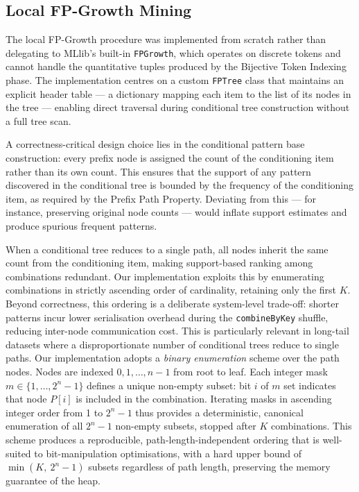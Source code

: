 \documentclass[10pt, twocolumn]{article}
\begin{document}
\subsection{Local FP-Growth Mining}

The local FP-Growth procedure was implemented from scratch rather than
delegating to MLlib's built-in \texttt{FPGrowth}, which operates on discrete
tokens and cannot handle the quantitative tuples produced by the Bijective
Token Indexing phase. The implementation centres on a custom \texttt{FPTree}
class that maintains an explicit header table — a dictionary mapping each item
to the list of its nodes in the tree — enabling direct traversal during
conditional tree construction without a full tree scan.

A correctness-critical design choice lies in the conditional pattern base
construction: every prefix node is assigned the count of the conditioning item
rather than its own count. This ensures that the support of any pattern
discovered in the conditional tree is bounded by the frequency of the
conditioning item, as required by the Prefix Path Property. Deviating from
this — for instance, preserving original node counts — would inflate support
estimates and produce spurious frequent patterns.

When a conditional tree reduces to a single path, all nodes inherit the same
count from the conditioning item, making support-based ranking among
combinations redundant. Our implementation exploits this by enumerating
combinations in strictly ascending order of cardinality, retaining only the
first $K$. Beyond correctness, this ordering is a deliberate system-level
trade-off: shorter patterns incur lower serialisation overhead during the
\texttt{combineByKey} shuffle, reducing inter-node communication cost. This is
particularly relevant in long-tail datasets where a disproportionate number of
conditional trees reduce to single paths.
Our implementation adopts a \textit{binary enumeration} scheme over the
path nodes. Nodes are indexed $0, 1, \dots, n{-}1$ from root to leaf.
Each integer mask $m \in \{1, \dots, 2^n - 1\}$ defines a unique
non-empty subset: bit $i$ of $m$ set indicates that node $P[i]$ is
included in the combination. Iterating masks in ascending integer order
from 1 to $2^n - 1$ thus provides a deterministic, canonical enumeration
of all $2^n - 1$ non-empty subsets, stopped after $K$ combinations. This
scheme produces a reproducible, path-length-independent ordering that is
well-suited to bit-manipulation optimisations, with a hard upper bound of
$\min(K,\ 2^n - 1)$ subsets regardless of path length, preserving the
memory guarantee of the heap.
\end{document}
